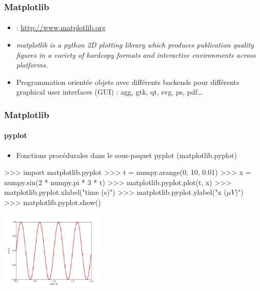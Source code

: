 \begin{frame}[fragile]
\frametitle{Matplotlib}
\framesubtitle{}
\begin{itemize}
 \item {} : \url{http://www.matplotlib.org}
 \item \emph{matplotlib is a python 2D plotting library which produces publication quality figures in a variety of hardcopy formats and interactive environments across platforms. }
 \item Programmation orientée objets avec différents backends pour différents graphical user interfaces (GUI) : agg, gtk, qt, svg, ps, pdf\dots
\end{itemize}
\end{frame}
\begin{frame}[fragile]
\frametitle{Matplotlib}
\framesubtitle{pyplot}
\begin{itemize}
 \item Fonctions procédurales dans le sous-paquet pyplot (matplotlib.pyplot)
\end{itemize}
\begin{minipage}[c]{6cm}
\begin{pythonConsole}
>>> import matplotlib.pyplot
>>> t = numpy.arange(0, 10, 0.01)
>>> x = numpy.sin(2 * numpy.pi * 3 * t)
>>> matplotlib.pyplot.plot(t, x)
>>> matplotlib.pyplot.xlabel("time (s)")
>>> matplotlib.pyplot.ylabel("x ($\mu V$)")
>>> matplotlib.pyplot.show()
\end{pythonConsole}
\end{minipage}
\begin{minipage}[c]{5cm}
\begin{center}
 \includegraphics[width=5cm]{./fig/matplotlibSinus.pdf}
\end{center}
\end{minipage}
\end{frame}
